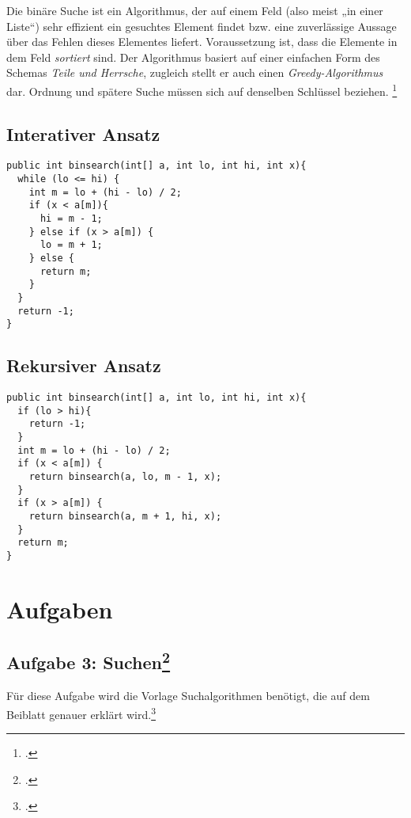 \documentclass{lehramt-informatik-haupt}
\begin{document}
Die binäre Suche ist ein Algorithmus, der auf einem Feld (also meist „in
einer Liste“) sehr effizient ein gesuchtes Element findet bzw. eine
zuverlässige Aussage über das Fehlen dieses Elementes liefert.
Voraussetzung ist, dass die Elemente in dem Feld \emph{sortiert} sind.
Der Algorithmus basiert auf einer einfachen Form des Schemas \emph{Teile
und Herrsche}, zugleich stellt er auch einen \emph{Greedy-Algorithmus}
dar. Ordnung und spätere Suche müssen sich auf denselben Schlüssel
beziehen.
\footcite{wiki:binaere-suche}

\cite[Seite 17 (PDF 9)]{aud:fs:2}

\section{Interativer Ansatz}

\begin{verbatim}
public int binsearch(int[] a, int lo, int hi, int x){
  while (lo <= hi) {
    int m = lo + (hi - lo) / 2;
    if (x < a[m]){
      hi = m - 1;
    } else if (x > a[m]) {
      lo = m + 1;
    } else {
      return m;
    }
  }
  return -1;
}
\end{verbatim}

\section{Rekursiver Ansatz}

\begin{verbatim}
public int binsearch(int[] a, int lo, int hi, int x){
  if (lo > hi){
    return -1;
  }
  int m = lo + (hi - lo) / 2;
  if (x < a[m]) {
    return binsearch(a, lo, m - 1, x);
  }
  if (x > a[m]) {
    return binsearch(a, m + 1, hi, x);
  }
  return m;
}
\end{verbatim}


\chapter{Aufgaben}

\section{Aufgabe 3: Suchen\footcite{aud:ab:2}}

Für diese Aufgabe wird die Vorlage Suchalgorithmen benötigt, die auf dem
Beiblatt genauer erklärt wird.\footcite{Diese Aufgabe stammt aus dem
Übungsblatt 1 zu Algorithmen und Datenstrukturen von Prof. Dr. Martin
Hennecke und Rainer Gall an der Universität Würzburg und wurde
dankenswerterweise zur Verwendung in diesem Aufgabenblatt zur Verfügung
gestellt.}
\end{document}
